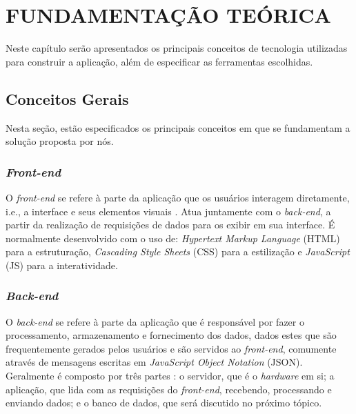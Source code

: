 \section{FUNDAMENTAÇÃO TEÓRICA}


Neste capítulo serão apresentados os principais conceitos de tecnologia utilizadas para construir a aplicação, além de especificar as ferramentas escolhidas.

\subsection{Conceitos Gerais}
Nesta seção, estão especificados os principais conceitos em que se fundamentam a solução proposta por nós.

\subsubsection{\textit{Front-end}}
O \textit{front-end} se refere à parte da aplicação que os usuários interagem diretamente, i.e., a interface e seus elementos visuais \cite{backFront}. Atua juntamente com o \textit{back-end}, a partir da realização de requisições de dados para os exibir em sua interface. É normalmente desenvolvido com o uso de: \textit{Hypertext Markup Language} (HTML) para a estruturação, \textit{Cascading Style Sheets} (CSS) para a estilização e \textit{JavaScript} (JS) para a interatividade.

\subsubsection{\textit{Back-end}}
O \textit{back-end} se refere à parte da aplicação que é responsável por fazer o processamento, armazenamento e fornecimento dos dados, dados estes que são frequentemente gerados pelos usuários e são servidos ao \textit{front-end}, comumente através de mensagens escritas em \textit{JavaScript Object Notation} (JSON). Geralmente é composto por três partes \cite{backFront}: o servidor, que é o \textit{hardware} em si; a aplicação, que lida com as requisições do \textit{front-end}, recebendo, processando e enviando dados; e o banco de dados, que será discutido no próximo tópico.

